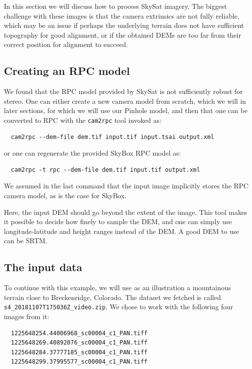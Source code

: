 In this section we will discuss how to process SkySat imagery. The
biggest challenge with these images is that the camera extrinsics are
not fully reliable, which may be an issue if perhaps the underlying
terrain does not have sufficient topography for good alignment, or if
the obtained DEMs are too far from their correct position for alignment
to succeed.

\subsection{Creating an RPC model}

We found that the RPC model provided by SkySat is not sufficiently
robust for stereo.  One can either create a new camera model from
scratch, which we will in later sections, for which we will use our
Pinhole model, and then that one can be converted to RPC with the
\texttt{cam2rpc} tool invoked as:

\begin{verbatim}
  cam2rpc --dem-file dem.tif input.tif input.tsai output.xml 
\end{verbatim}

or one can regenerate the provided SkyBox RPC model as:

\begin{verbatim}
  cam2rpc -t rpc --dem-file dem.tif input.tif output.xml
\end{verbatim}

We assumed in the last command that the input image implicitly stores
the RPC camera model, as is the case for SkyBox.

Here, the input DEM should go beyond the extent of the image.  This tool
makes it possible to decide how finely to sample the DEM, and one can
simply use longitude-latitude and height ranges instead of the DEM. A
good DEM to use can be SRTM.

\subsection{The input data}

To continue with this example, we will use as an illustration a
mountainous terrain close to Breckenridge, Colorado. The dataset we
fetched is called \texttt{s4\_20181107T175036Z\_video.zip}. We chose to
work with the following four images from it:

\begin{verbatim}
  1225648254.44006968_sc00004_c1_PAN.tiff
  1225648269.40892076_sc00004_c1_PAN.tiff
  1225648284.37777185_sc00004_c1_PAN.tiff
  1225648299.37995577_sc00004_c1_PAN.tiff
\end{verbatim}

